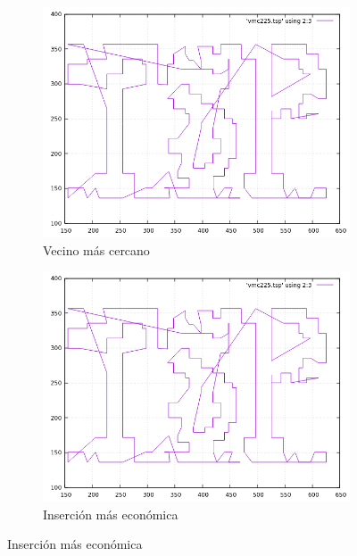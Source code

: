 \documentclass[12pt,spanish]{article}
\begin{document}
\begin{figure}[H]
\centering
\begin{subfigure}[b]{0.36\textwidth}
\includegraphics[width=\textwidth]{tsp225_vmc.png}
\caption{Vecino más cercano}
\end{subfigure}
\quad
\begin{subfigure}[b]{0.36\textwidth}
\includegraphics[width=\textwidth]{tsp225_vmc.png}
\caption{Inserción más económica}
\end{subfigure}

\vspace{1cm}


\end{figure}
\end{document}
